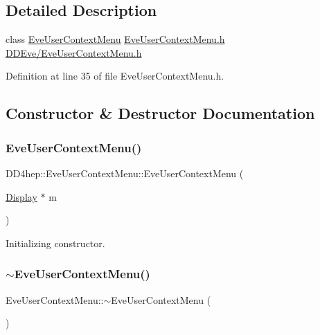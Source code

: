 \subsection{Detailed Description}
class \hyperlink{class_d_d4hep_1_1_eve_user_context_menu}{Eve\+User\+Context\+Menu} \hyperlink{_eve_user_context_menu_8h}{Eve\+User\+Context\+Menu.\+h} \hyperlink{_eve_user_context_menu_8h}{D\+D\+Eve/\+Eve\+User\+Context\+Menu.\+h} 

Definition at line 35 of file Eve\+User\+Context\+Menu.\+h.



\subsection{Constructor \& Destructor Documentation}
\hypertarget{class_d_d4hep_1_1_eve_user_context_menu_a2ea274ad2ba442a5ecfa2b438ee4d4aa}{}\label{class_d_d4hep_1_1_eve_user_context_menu_a2ea274ad2ba442a5ecfa2b438ee4d4aa} 
\subsubsection{\texorpdfstring{Eve\+User\+Context\+Menu()}{EveUserContextMenu()}}
{\footnotesize\ttfamily D\+D4hep\+::\+Eve\+User\+Context\+Menu\+::\+Eve\+User\+Context\+Menu (\begin{DoxyParamCaption}\item[{\hyperlink{class_d_d4hep_1_1_display}{Display} $\ast$}]{m }\end{DoxyParamCaption})}



Initializing constructor. 

\hypertarget{class_d_d4hep_1_1_eve_user_context_menu_a48d1bbc000743f3a363ea230ab4eeb0c}{}\label{class_d_d4hep_1_1_eve_user_context_menu_a48d1bbc000743f3a363ea230ab4eeb0c} 
\subsubsection{\texorpdfstring{$\sim$\+Eve\+User\+Context\+Menu()}{~EveUserContextMenu()}}
{\footnotesize\ttfamily Eve\+User\+Context\+Menu\+::$\sim$\+Eve\+User\+Context\+Menu (\begin{DoxyParamCaption}{ }\end{DoxyParamCaption})\hspace{0.3cm}{\ttfamily [virtual]}}



